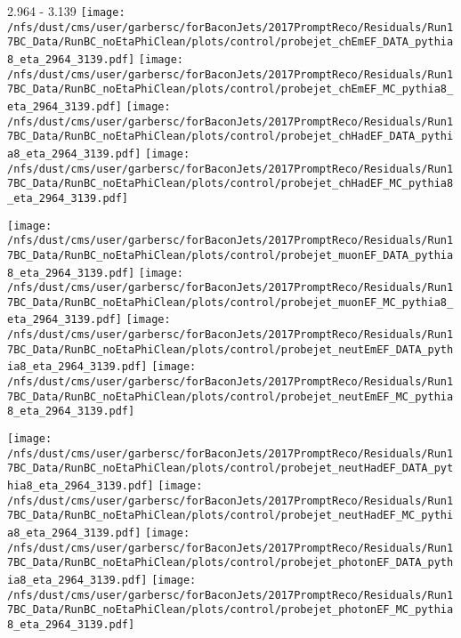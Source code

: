 \documentclass[t,compress]{beamer}
\begin{document}
\begin{frame}{2.964 - 3.139}
	\texttt{[image: /nfs/dust/cms/user/garbersc/forBaconJets/2017PromptReco/Residuals/Run17BC\_Data/RunBC\_noEtaPhiClean/plots/control/probejet\_chEmEF\_DATA\_pythia8\_eta\_2964\_3139.pdf]}
	\texttt{[image: /nfs/dust/cms/user/garbersc/forBaconJets/2017PromptReco/Residuals/Run17BC\_Data/RunBC\_noEtaPhiClean/plots/control/probejet\_chEmEF\_MC\_pythia8\_eta\_2964\_3139.pdf]}
	\texttt{[image: /nfs/dust/cms/user/garbersc/forBaconJets/2017PromptReco/Residuals/Run17BC\_Data/RunBC\_noEtaPhiClean/plots/control/probejet\_chHadEF\_DATA\_pythia8\_eta\_2964\_3139.pdf]}
	\texttt{[image: /nfs/dust/cms/user/garbersc/forBaconJets/2017PromptReco/Residuals/Run17BC\_Data/RunBC\_noEtaPhiClean/plots/control/probejet\_chHadEF\_MC\_pythia8\_eta\_2964\_3139.pdf]}
\newline

\vspace{-0.65cm}
	\texttt{[image: /nfs/dust/cms/user/garbersc/forBaconJets/2017PromptReco/Residuals/Run17BC\_Data/RunBC\_noEtaPhiClean/plots/control/probejet\_muonEF\_DATA\_pythia8\_eta\_2964\_3139.pdf]}
	\texttt{[image: /nfs/dust/cms/user/garbersc/forBaconJets/2017PromptReco/Residuals/Run17BC\_Data/RunBC\_noEtaPhiClean/plots/control/probejet\_muonEF\_MC\_pythia8\_eta\_2964\_3139.pdf]}
	\texttt{[image: /nfs/dust/cms/user/garbersc/forBaconJets/2017PromptReco/Residuals/Run17BC\_Data/RunBC\_noEtaPhiClean/plots/control/probejet\_neutEmEF\_DATA\_pythia8\_eta\_2964\_3139.pdf]}
	\texttt{[image: /nfs/dust/cms/user/garbersc/forBaconJets/2017PromptReco/Residuals/Run17BC\_Data/RunBC\_noEtaPhiClean/plots/control/probejet\_neutEmEF\_MC\_pythia8\_eta\_2964\_3139.pdf]}
\newline

\vspace{-0.65cm}
	\texttt{[image: /nfs/dust/cms/user/garbersc/forBaconJets/2017PromptReco/Residuals/Run17BC\_Data/RunBC\_noEtaPhiClean/plots/control/probejet\_neutHadEF\_DATA\_pythia8\_eta\_2964\_3139.pdf]}
	\texttt{[image: /nfs/dust/cms/user/garbersc/forBaconJets/2017PromptReco/Residuals/Run17BC\_Data/RunBC\_noEtaPhiClean/plots/control/probejet\_neutHadEF\_MC\_pythia8\_eta\_2964\_3139.pdf]}
	\texttt{[image: /nfs/dust/cms/user/garbersc/forBaconJets/2017PromptReco/Residuals/Run17BC\_Data/RunBC\_noEtaPhiClean/plots/control/probejet\_photonEF\_DATA\_pythia8\_eta\_2964\_3139.pdf]}
	\texttt{[image: /nfs/dust/cms/user/garbersc/forBaconJets/2017PromptReco/Residuals/Run17BC\_Data/RunBC\_noEtaPhiClean/plots/control/probejet\_photonEF\_MC\_pythia8\_eta\_2964\_3139.pdf]}
\end{frame}
\end{document}
